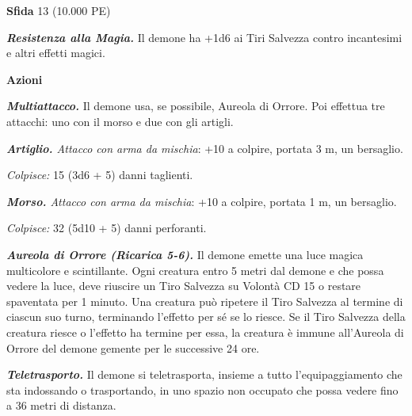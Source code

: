\begin{multicols}{2}
\textbf{Sfida} 13 (10.000 PE)

\emph{\textbf{Resistenza alla Magia.}} Il demone ha +1d6 ai Tiri Salvezza contro incantesimi e altri effetti magici.

\textbf{Azioni}

\emph{\textbf{Multiattacco.}} Il demone usa, se possibile, Aureola di Orrore. Poi effettua tre attacchi: uno con il morso e due con gli artigli.

\emph{\textbf{Artiglio.} Attacco con arma da mischia}: +10 a colpire, portata 3 m, un bersaglio.

\emph{Colpisce:} 15 (3d6 + 5) danni taglienti.

\emph{\textbf{Morso.} Attacco con arma da mischia}: +10 a colpire, portata 1 m, un bersaglio.

\emph{Colpisce:} 32 (5d10 + 5) danni perforanti.

\emph{\textbf{Aureola di Orrore (Ricarica 5-6).}} Il demone emette una luce magica multicolore e scintillante. Ogni creatura entro 5 metri dal demone e che possa vedere la luce, deve riuscire un Tiro Salvezza su Volontà CD 15 o restare spaventata per 1 minuto. Una creatura può ripetere il Tiro Salvezza al termine di ciascun suo turno, terminando l'effetto per sé se lo riesce. Se il Tiro Salvezza della creatura riesce o l'effetto ha termine per essa, la creatura è immune all'Aureola di
Orrore del demone gemente per le successive 24 ore.

\emph{\textbf{Teletrasporto.}} Il demone si teletrasporta, insieme a tutto l'equipaggiamento che sta indossando o trasportando, in uno spazio non occupato che possa vedere fino a 36 metri di distanza.


\end{multicols}
